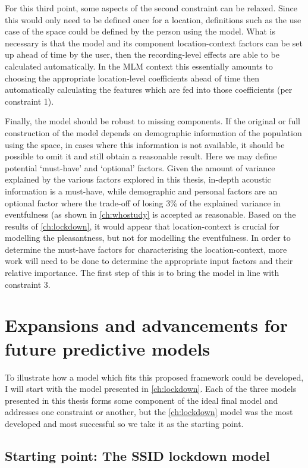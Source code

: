 For this third point, some aspects of the second constraint can be relaxed. Since this would only need to be defined once for a location, definitions such as the use case of the space could be defined by the person using the model. What is necessary is that the model and its component location-context factors can be set up ahead of time by the user, then the recording-level effects are able to be calculated automatically. In the MLM context this essentially amounts to choosing the appropriate location-level coefficients ahead of time then automatically calculating the features which are fed into those coefficients (per constraint 1).

Finally, the model should be robust to missing components. If the original or full construction of the model depends on demographic information of the population using the space, in cases where this information is not available, it should be possible to omit it and still obtain a reasonable result. Here we may define potential `must-have’ and `optional’ factors. Given the amount of variance explained by the various factors explored in this thesis, in-depth acoustic information is a must-have, while demographic and personal factors are an optional factor where the trade-off of losing 3\% of the explained variance in eventfulness (as shown in \cref{ch:whostudy} is accepted as reasonable. Based on the results of \cref{ch:lockdown}, it would appear that location-context is crucial for modelling the pleasantness, but not for modelling the eventfulness. In order to determine the must-have factors for characterising the location-context, more work will need to be done to determine the appropriate input factors and their relative importance. The first step of this is to bring the model in line with constraint 3. 


\section{Expansions and advancements for future predictive models}

To illustrate how a model which fits this proposed framework could be developed, I will start with the model presented in \cref{ch:lockdown}. Each of the three models presented in this thesis forms some component of the ideal final model and addresses one constraint or another, but the \cref{ch:lockdown} model was the most developed and most successful so we take it as the starting point.

\subsection{Starting point: The SSID lockdown model}

